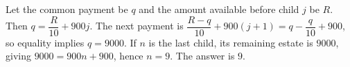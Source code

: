 Let the common payment be $q$ and the amount available before child $j$ be $R$. Then $q=\dfrac{R}{10}+900j$. The next payment is $\dfrac{R-q}{10}+900(j+1)=q-\dfrac{q}{10}+900$, so equality implies $q=9000$. If $n$ is the last child, its remaining estate is $9000$, giving $9000=900n+900$, hence $n=9$. The answer is $\boxed9$.
